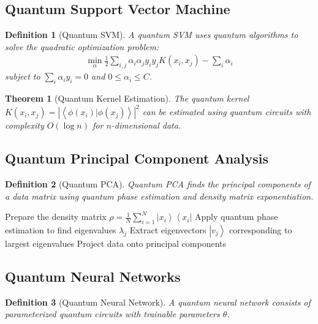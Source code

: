 \documentclass[11pt]{article}
\newtheorem{definition}{Definition}[section]
\newtheorem{theorem}{Theorem}[section]
\newcommand{\ket}[1]{\left|#1\right\rangle}
\newcommand{\bra}[1]{\left\langle#1\right|}
\newcommand{\braket}[2]{\left\langle#1|#2\right\rangle}
\begin{document}
\subsection{Quantum Support Vector Machine}

\begin{definition}[Quantum SVM]
A quantum SVM uses quantum algorithms to solve the quadratic optimization problem:
\begin{align}
\min_{\alpha} \frac{1}{2} \sum_{i,j} \alpha_i \alpha_j y_i y_j K(x_i, x_j) - \sum_i \alpha_i
\end{align}
subject to $\sum_i \alpha_i y_i = 0$ and $0 \leq \alpha_i \leq C$.
\end{definition}

\begin{theorem}[Quantum Kernel Estimation]
The quantum kernel $K(x_i, x_j) = |\braket{\phi(x_i)}{\phi(x_j)}|^2$ can be estimated using quantum circuits with complexity $O(\log n)$ for $n$-dimensional data.
\end{theorem}

\subsection{Quantum Principal Component Analysis}

\begin{definition}[Quantum PCA]
Quantum PCA finds the principal components of a data matrix using quantum phase estimation and density matrix exponentiation.
\end{definition}

\begin{algorithm}
\caption{Quantum PCA Algorithm}
\begin{algorithmic}[1]
\STATE Prepare the density matrix $\rho = \frac{1}{N} \sum_{i=1}^N \ket{x_i}\bra{x_i}$
\STATE Apply quantum phase estimation to find eigenvalues $\lambda_j$
\STATE Extract eigenvectors $\ket{v_j}$ corresponding to largest eigenvalues
\STATE Project data onto principal components
\end{algorithmic}
\end{algorithm}

\subsection{Quantum Neural Networks}

\begin{definition}[Quantum Neural Network]
A quantum neural network consists of parameterized quantum circuits with trainable parameters $\theta$.
\end{definition}
\end{document}

